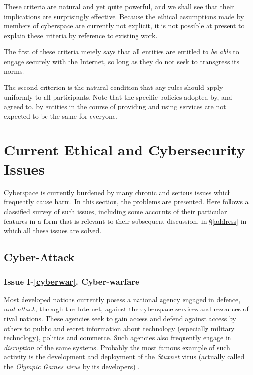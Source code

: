 These criteria are natural and yet quite powerful, and we shall see that their implications are surprisingly effective. Because the ethical assumptions made by members of cyberspace are currently not explicit, it is not possible at present to explain these criteria by reference to existing work.

The first of these criteria merely says that all entities are entitled to {\em be able} to engage securely with the Internet, so long as they do not seek to transgress its norms.

The second criterion is the natural condition that any rules should apply uniformly to all participants. Note that the specific policies adopted by, and agreed to, by entities in the course of providing and using services are not expected to be the same for everyone.

\section{Current Ethical and Cybersecurity Issues}\label{issues}

Cyberspace is currently burdened by many chronic and serious issues which frequently cause harm. In this section, the problems are presented. Here follows a classified survey of such issues, including some accounts of their particular features in a form that is relevant to their subsequent discussion, in \S \ref{address} in which all these issues are solved.

\subsection{Cyber-Attack}\label{cybattk}

\subsubsection*{Issue I-\ref{cyberwar}. {Cyber-warfare}}\label{cyberwarsol}
%
Most developed nations currently posess a national agency
engaged in defence, {\em and attack}, through the Internet,
against the cyberspace services and resources of rival nations.
These agencies seek to gain access and defend against
access by others to public and secret information
about technology (especially military technology),
politics and commerce. 
Such agencies also frequently engage in {\em disruption} of the same systems. Probably
the most famous example of such activity is the development
and deployment of the {\em Stuxnet} virus (actually called the 
{\em Olympic Games virus} by its developers)  \cite{kushner2013real,langner2011stuxnet} .


